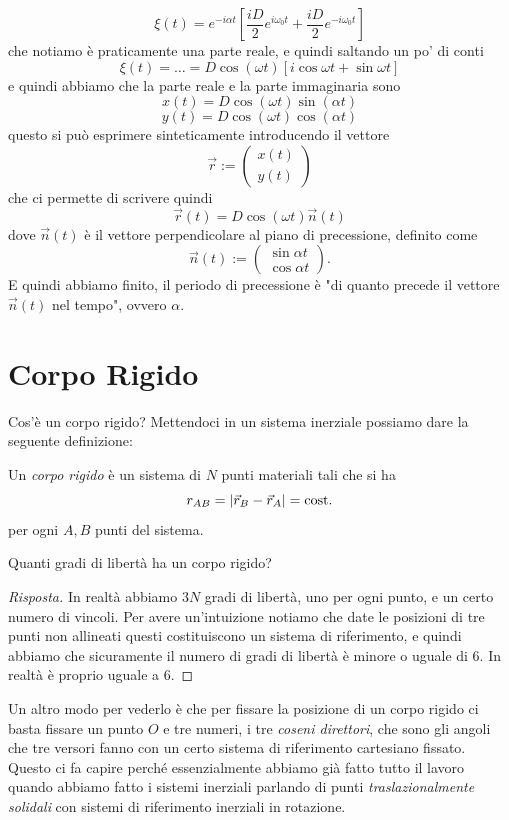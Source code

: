 \documentclass[11pt]{scrartcl}
\begin{document}
	$$\xi(t)=e^{-i\alpha t}\left[\frac{iD}{2}e^{i\omega_0 t}+\frac{iD}{2}e^{-i\omega_0 t}\right]$$
	che notiamo è praticamente una parte reale, e quindi saltando un po' di conti
	$$\xi(t)=\dots=D\cos(\omega t)\left[i\cos\omega t +\sin\omega t\right]$$
	e quindi abbiamo che la parte reale e la parte immaginaria sono
	$$x(t)=D\cos(\omega t)\sin(\alpha t)$$
	$$y(t)=D\cos(\omega t)\cos(\alpha t)$$
	questo si può esprimere sinteticamente introducendo il vettore 
	$$\vec{r}:=\begin{pmatrix}
		x(t) \\
		y(t)
	\end{pmatrix}$$
	che ci permette di scrivere quindi 
	$$\vec{r}(t)=D\cos(\omega t)\vec{n}(t)$$
	dove $\vec{n}(t)$ è il vettore perpendicolare al piano di precessione, definito come
	$$\vec{n}(t):=
	\begin{pmatrix}
		\sin \alpha t \\
		\cos \alpha t
	\end{pmatrix}.
	$$
	E quindi abbiamo finito, il periodo di precessione è "di quanto precede il vettore $\vec{n}(t)$ nel tempo", ovvero $\alpha$.
	
	\newpage
	
	\section{Corpo Rigido}
	Cos'è un corpo rigido? Mettendoci in un sistema inerziale possiamo dare la seguente definizione:
	\begin{definition}
		Un \textit{corpo rigido} è un sistema di $N$ punti materiali tali che si ha
		$$r_{AB}=\left\lvert \vec{r}_B-\vec{r}_A \right\rvert=\text{cost.}$$
		per ogni $A,B$ punti del sistema.
	\end{definition}
	\begin{problem}
		Quanti gradi di libertà ha un corpo rigido?
	\end{problem}
	\begin{proof}[Risposta]
		In realtà abbiamo $3N$ gradi di libertà, uno per ogni punto, e un certo numero di vincoli. Per avere un'intuizione notiamo che date le posizioni di tre punti non allineati questi costituiscono un sistema di riferimento, e quindi abbiamo che sicuramente il numero di gradi di libertà è minore o uguale di $6$. In realtà è proprio uguale a $6$.
	\end{proof}
	Un altro modo per vederlo è che per fissare la posizione di un corpo rigido ci basta fissare un punto $O$ e tre numeri, i tre \textit{coseni direttori}, che sono gli angoli che tre versori fanno con un certo sistema di riferimento cartesiano fissato. Questo ci fa capire perché essenzialmente abbiamo già fatto tutto il lavoro quando abbiamo fatto i sistemi inerziali parlando di punti \textit{traslazionalmente solidali} con sistemi di riferimento inerziali in rotazione.
\end{document}
